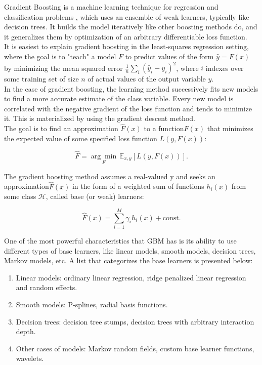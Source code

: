 \documentclass[letterpaper, 10 pt, conference]{ieeeconf}  %
\begin{document}
{Gradient Boosting} is a machine learning technique for regression and classification problems \cite{c11}, which uses an ensemble of weak learners, typically like decision trees. It builds the model iteratively like other boosting methods do, and it generalizes them by optimization of an arbitrary differentiable loss function.  \\

It is easiest to explain gradient boosting in the least-squares regression setting, where the goal is to "teach" a model $F$ to predict values of the form $\hat {y}=F(x)$ by minimizing the mean squared error $\tfrac {1}{n}\sum _{i}({\hat {y}}_{i}-y_{i})^{2}$, where $i$ indexes over some training set of size $n$ of actual values of the output variable $y$.  \\

In the case of gradient boosting, the learning method successively fits new models to find a more accurate estimate of the class variable. Every new model is correlated with the negative gradient of the loss function and tends to minimize it. This is materialized by using the gradient descent method.\\

The goal is to find an approximation $\hat {F}(x)$ to a function$F(x)$ that minimizes the expected value of some specified loss function $L(y, F(x))$:

    $${\displaystyle {\hat {F}}={\underset {F}{\arg \min }}\,\mathbb {E} _{x,y}[L(y,F(x))]}.$$

The gradient boosting method assumes a real-valued y and seeks an approximation$\hat{F}(x)$ in the form of a weighted sum of functions $h_i (x)$ from some class $\mathcal {H}$, called base (or weak) learners:

   $$ {\displaystyle {\hat {F}}(x)=\sum _{i=1}^{M}\gamma _{i}h_{i}(x)+{\mbox{const}}}.$$
    
One of the most powerful characteristics that GBM has is its ability to use different types of base learners, like linear models, smooth models, decision trees, Markov models, etc. A list that categorizes the base learners is presented below:
\begin{enumerate}
    \item Linear models: ordinary linear regression, ridge penalized linear regression and random effects.
    \item Smooth models: P-splines, radial basis functions.
    \item Decision trees: decision tree stumps, decision trees with arbitrary interaction depth.
    \item Other cases of models: Markov random fields, custom base learner functions, wavelets.
\end{enumerate}
\end{document}
